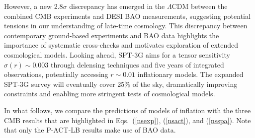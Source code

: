 \documentclass[aps,prev,twocolumn,preprintnumbers,floatfix,nofootinbib]{revtex4-1}
\begin{document}
However, a new 2.8$\sigma$ discrepancy has emerged in the $\Lambda$CDM between the combined CMB experiments and DESI BAO measurements, suggesting potential tensions in our understanding of late-time cosmology. This discrepancy between contemporary ground-based experiments and BAO data highlights the importance of systematic cross-checks and motivates exploration of extended cosmological models. Looking ahead, SPT-3G aims for a tensor sensitivity $\sigma(r) \sim 0.003$ through delensing techniques and five years of integrated observations, potentially accessing $r \sim 0.01$ inflationary models. The expanded SPT-3G survey will eventually cover 25\% of the sky, dramatically improving constraints and enabling more stringent tests of cosmological models.

In what follows, we compare the predictions of models of inflation with the three CMB results that are highlighted in Eqs.~(\ref{nsexp}), (\ref{nsact}), and (\ref{nsspa}). Note that only the P-ACT-LB results make use of BAO data. 

\end{document}
